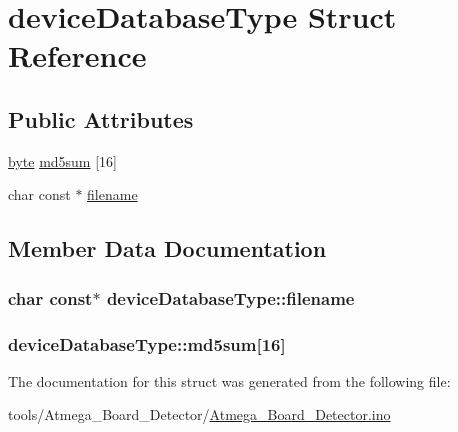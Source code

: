 \hypertarget{structdeviceDatabaseType}{\section{device\-Database\-Type Struct Reference}
\label{structdeviceDatabaseType}
}
\subsection*{Public Attributes}
\begin{DoxyCompactItemize}
\item 
\hyperlink{Arduino_8h_ab8ef12fab634c171394422d0ee8baf94}{byte} \hyperlink{structdeviceDatabaseType_aae89b6c96d451a234fdb844fecc3212f}{md5sum} \mbox{[}16\mbox{]}
\item 
char const $\ast$ \hyperlink{structdeviceDatabaseType_a0eb69eb6c549ca1491313e92fb94c93b}{filename}
\end{DoxyCompactItemize}


\subsection{Member Data Documentation}
\hypertarget{structdeviceDatabaseType_a0eb69eb6c549ca1491313e92fb94c93b}{
\subsubsection[{filename}]{\setlength{\rightskip}{0pt plus 5cm}char const$\ast$ device\-Database\-Type\-::filename}}\label{structdeviceDatabaseType_a0eb69eb6c549ca1491313e92fb94c93b}
\hypertarget{structdeviceDatabaseType_aae89b6c96d451a234fdb844fecc3212f}{
\subsubsection[{md5sum}]{ device\-Database\-Type\-::md5sum\mbox{[}16\mbox{]}}}\label{structdeviceDatabaseType_aae89b6c96d451a234fdb844fecc3212f}


The documentation for this struct was generated from the following file\-:\begin{DoxyCompactItemize}
\item 
tools/\-Atmega\-\_\-\-Board\-\_\-\-Detector/\hyperlink{Atmega__Board__Detector_8ino}{Atmega\-\_\-\-Board\-\_\-\-Detector.\-ino}\end{DoxyCompactItemize}
